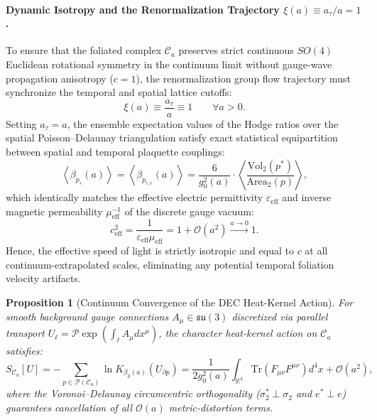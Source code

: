 \documentclass[11pt, a4paper]{article}
\newtheorem{proposition}[theorem]{Proposition}
\theoremstyle{definition}
\theoremstyle{remark}
\begin{document}
\paragraph{Dynamic Isotropy and the Renormalization Trajectory $\xi(a) \equiv a_{\tau}/a = 1$.}
To ensure that the foliated complex $\mathcal{C}_{a}$ preserves strict continuous $SO(4)$ Euclidean rotational symmetry in the continuum limit without gauge-wave propagation anisotropy ($c = 1$), the renormalization group flow trajectory must synchronize the temporal and spatial lattice cutoffs:
\begin{equation}
  \xi(a) \equiv \frac{a_{\tau}}{a} \equiv 1 \qquad \forall a > 0.
\end{equation}
Setting $a_{\tau} = a$, the ensemble expectation values of the Hodge ratios over the spatial Poisson--Delaunay triangulation satisfy exact statistical equipartition between spatial and temporal plaquette couplings:
\begin{equation}
  \left\langle \beta_{p_{s}}(a) \right\rangle = \left\langle \beta_{p_{\tau, e}}(a) \right\rangle = \frac{6}{g_{0}^{2}(a)} \cdot \left\langle \frac{\mathrm{Vol}_{2}(p^{*})}{\mathrm{Area}_{2}(p)} \right\rangle,
\end{equation}
which identically matches the effective electric permittivity $\varepsilon_{\mathrm{eff}}$ and inverse magnetic permeability $\mu_{\mathrm{eff}}^{-1}$ of the discrete gauge vacuum:
\begin{equation}
  c_{\mathrm{eff}}^{2} = \frac{1}{\varepsilon_{\mathrm{eff}}\mu_{\mathrm{eff}}} = 1 + \mathcal{O}(a^{2}) \xrightarrow{a \to 0} 1.
\end{equation}
Hence, the effective speed of light is strictly isotropic and equal to $c$ at all continuum-extrapolated scales, eliminating any potential temporal foliation velocity artifacts.

\begin{proposition}[Continuum Convergence of the DEC Heat-Kernel Action]
\label{prop:dec_convergence}
For smooth background gauge connections $A_{\mu} \in \mathfrak{su}(3)$ discretized via parallel transport $U_{\ell} = \mathcal{P}\exp\!\left(\int_{\ell} A_{\mu}dx^{\mu}\right)$, the character heat-kernel action on $\mathcal{C}_{a}$ satisfies:
\begin{equation}
  S_{\mathcal{C}_{a}}[U] = -\sum_{p \in \mathcal{P}(\mathcal{C}_{a})} \ln K_{\beta_{p}(a)}(U_{\partial p}) = \frac{1}{2g_{0}^{2}(a)} \int_{\mathbb{R}^{4}} \mathrm{Tr}\!\left(F_{\mu\nu}F^{\mu\nu}\right) d^{4}x + \mathcal{O}(a^{2}),
\end{equation}
where the Voronoi--Delaunay circumcentric orthogonality ($\sigma_{2}^{*} \perp \sigma_{2}$ and $e^{*} \perp e$) guarantees cancellation of all $\mathcal{O}(a)$ metric-distortion terms.
\end{proposition}
\end{document}
